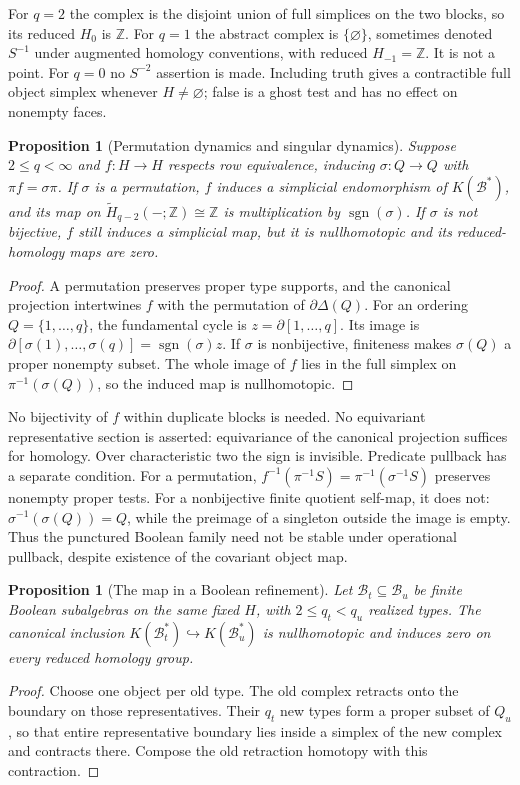 \documentclass[11pt]{article}
\newtheorem{proposition}[theorem]{Proposition}
\theoremstyle{definition}
\begin{document}
For $q=2$ the complex is the disjoint union of full simplices on the two
blocks, so its reduced $H_0$ is $\mathbb Z$. For $q=1$ the abstract
complex is $\{\varnothing\}$, sometimes denoted $S^{-1}$ under augmented
homology conventions, with reduced $H_{-1}=\mathbb Z$. It is not a point.
For $q=0$ no $S^{-2}$ assertion is made. Including truth gives a
contractible full object simplex whenever $H\ne\varnothing$; false is a
ghost test and has no effect on nonempty faces.

\begin{proposition}[Permutation dynamics and singular dynamics]
\label{prop:sign}
Suppose $2\le q<\infty$ and $f:H\to H$ respects row equivalence,
inducing $\sigma:Q\to Q$ with $\pi f=\sigma\pi$.
If $\sigma$ is a permutation, $f$ induces a simplicial endomorphism of
$K(\mathcal B^*)$, and its map on
$\widetilde H_{q-2}(-;\mathbb Z)\cong\mathbb Z$ is multiplication by
$\operatorname{sgn}(\sigma)$. If $\sigma$ is not bijective, $f$ still
induces a simplicial map, but it is nullhomotopic and its reduced-homology
maps are zero.
\end{proposition}
\begin{proof}
A permutation preserves proper type supports, and the canonical projection
intertwines $f$ with the permutation of $\partial\Delta(Q)$. For an
ordering $Q=\{1,\ldots,q\}$, the fundamental cycle is
$z=\partial[1,\ldots,q]$. Its image is
$\partial[\sigma(1),\ldots,\sigma(q)]
 =\operatorname{sgn}(\sigma)z$.
If $\sigma$ is nonbijective, finiteness makes $\sigma(Q)$ a proper
nonempty subset. The whole image of $f$ lies in the full simplex on
$\pi^{-1}(\sigma(Q))$, so the induced map is nullhomotopic.
\end{proof}

No bijectivity of $f$ within duplicate blocks is needed. No equivariant
representative section is asserted: equivariance of the canonical projection
suffices for homology. Over characteristic two the sign is invisible.
Predicate pullback has a separate condition. For a permutation,
$f^{-1}(\pi^{-1}S)=\pi^{-1}(\sigma^{-1}S)$ preserves nonempty proper
tests. For a nonbijective finite quotient self-map, it does not:
$\sigma^{-1}(\sigma(Q))=Q$, while the preimage of a singleton outside
the image is empty. Thus the punctured Boolean family need not be stable
under operational pullback, despite existence of the covariant object map.

\begin{proposition}[The map in a Boolean refinement]\label{prop:refinement}
Let $\mathcal B_t\subseteq\mathcal B_u$ be finite Boolean subalgebras
on the same fixed $H$, with $2\le q_t<q_u$ realized types. The canonical
inclusion $K(\mathcal B_t^*)\hookrightarrow K(\mathcal B_u^*)$ is
nullhomotopic and induces zero on every reduced homology group.
\end{proposition}
\begin{proof}
Choose one object per old type. The old complex retracts onto the boundary
on those representatives. Their $q_t$ new types form a proper subset of
$Q_u$, so that entire representative boundary lies inside a simplex of the
new complex and contracts there. Compose the old retraction homotopy with
this contraction.
\end{proof}
\end{document}
